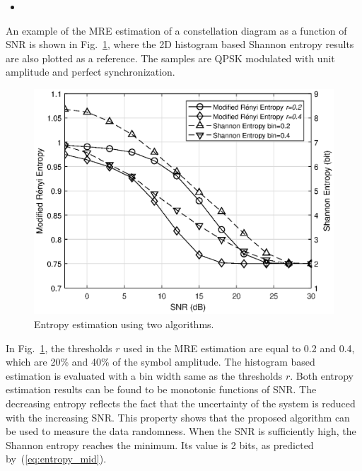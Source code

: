 \documentclass[12pt, draftclsnofoot, onecolumn]{IEEEtran}
\begin{document}
\begin{itemize}
\item 
\end{itemize}

An example of the MRE estimation of a constellation diagram as a function of SNR is shown in Fig.~\ref{fig:MRE}, where the 2D histogram based Shannon entropy results are also plotted as a reference.
The samples are QPSK modulated with unit amplitude and perfect synchronization.

\begin{figure}[ht]
\centering
\includegraphics[width=3 in]{pic/MRE-k.eps}
\caption{Entropy estimation using two algorithms.}
\label{fig:MRE} 
\end{figure}

In Fig.~\ref{fig:MRE}, the thresholds \(r\) used in the MRE estimation are equal to 0.2 and 0.4, which are 20\% and 40\% of the symbol amplitude. 
The histogram based estimation is evaluated with a bin width same as the thresholds \(r\).
Both entropy estimation results can be found to be monotonic functions of SNR.
The decreasing entropy reflects the fact that the uncertainty of the system is reduced with the increasing SNR.
This property shows that the proposed algorithm can be used to measure the data randomness.
When the SNR is sufficiently high, the Shannon entropy reaches the minimum. 
Its value is 2 bits, as predicted by~(\ref{eq:entropy_mid}).
\end{document}
